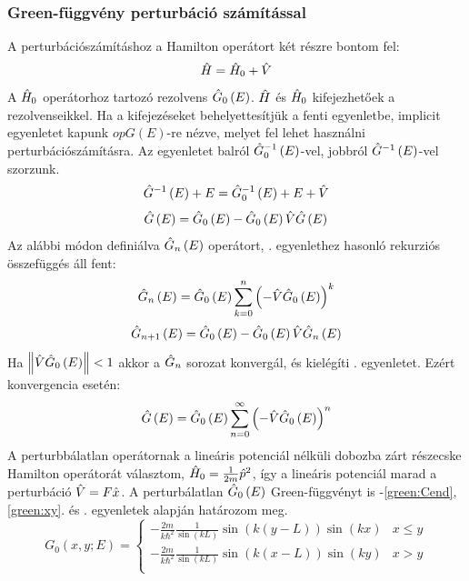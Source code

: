 \subsubsection{Green-függvény perturbáció számítással}
A perturbációszámításhoz a Hamilton operátort két részre bontom fel:
\begin{equation}
	\hat{H} = \hat{H}_0 + \hat{V}
\end{equation}
A $\hat{H}_0$ operátorhoz tartozó rezolvens $\hat{G}_0\left(E\right)$. $\hat{H}$ és $\hat{H}_0$ kifejezhetőek a rezolvenseikkel. Ha a kifejezéseket behelyettesítjük a fenti egyenletbe, implicit egyenletet kapunk $op{G}\left(E\right)$-re nézve, melyet fel lehet használni perturbációszámításra. Az egyenletet balról $\hat{G}_0^{-1}\left(E\right)$-vel, jobbról $\hat{G}^{-1}\left(E\right)$-vel szorzunk.
\begin{equation}
	\hat{G}^{-1}\left(E\right) + E = \hat{G}_0^{-1}\left(E\right) + E + \hat{V}
\end{equation}
\begin{equation}
	\hat{G}\left(E\right) = \hat{G}_0\left(E\right) - \hat{G}_0\left(E\right)\hat{V}\hat{G}\left(E\right)
	\label{green:pertmaster}
\end{equation}
Az alábbi módon definiálva $\hat{G}_n\left(E\right)$ operátort, . egyenlethez hasonló rekurziós összefüggés áll fent:
\begin{equation}
	\hat{G}_n\left(E\right) = \hat{G}_0\left(E\right)\sum_{k=0}^n\left(-\hat{V}\hat{G}_0\left(E\right)\right)^k
\end{equation}
\begin{equation}
	\hat{G}_{n+1}\left(E\right) = \hat{G}_0\left(E\right) - \hat{G}_0\left(E\right)\hat{V}\hat{G}_n\left(E\right)
\end{equation}
Ha $\left\lVert \hat{V}\hat{G}_0\left(E\right) \right\rVert < 1$ akkor a $\hat{G}_n$ sorozat konvergál, és kielégíti . egyenletet. Ezért konvergencia esetén:
\begin{equation}
	\hat{G}\left(E\right) = \hat{G}_0\left(E\right)\sum_{n=0}^\infty\left(-\hat{V}\hat{G}_0\left(E\right)\right)^n
\end{equation}
A perturbbálatlan operátornak a lineáris potenciál nélküli dobozba zárt részecske Hamilton operátorát választom, $\hat{H}_0=\frac{1}{2m}\hat{p}^2$, így a lineáris potenciál marad a perturbáció $\hat{V} = F\hat{x}$. A perturbálatlan $\hat{G}_0\left(E\right)$ Green-függvényt is -\ref{green:Cend}, \ref{green:xy}. és . egyenletek alapján határozom meg.
\begin{equation}
	G_0\left(x,y;E\right) =
	\begin{cases}
		-\frac{2m}{k\hbar^2}\frac{1}{\sin\left(kL\right)} \sin\left(k\left(y-L\right)\right)\sin\left(kx\right) & x\leq y\\
		-\frac{2m}{k\hbar^2}\frac{1}{\sin\left(kL\right)} \sin\left(k\left(x-L\right)\right)\sin\left(ky\right) & x>y\\
	\end{cases}
\end{equation}
